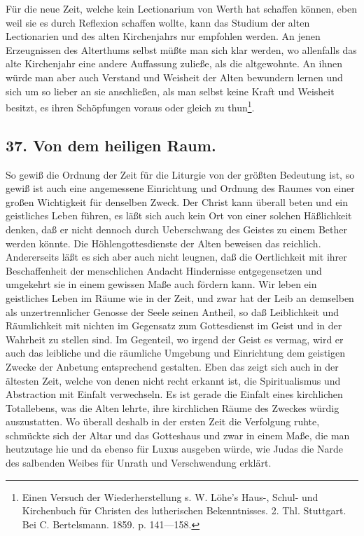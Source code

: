 Für die neue Zeit, welche kein Lectionarium von Werth hat schaffen können, eben weil sie es durch Reflexion schaffen
wollte, kann das Studium der alten Lectionarien und des alten Kirchenjahrs nur empfohlen werden. An jenen Erzeugnissen des Alterthums selbst müßte man sich klar werden, wo allenfalls das alte Kirchenjahr eine andere Auffassung zuließe, als die altgewohnte. An ihnen würde man aber auch Verstand und Weisheit der Alten bewundern lernen und sich um so lieber an sie anschließen, als man selbst keine Kraft und Weisheit besitzt, es ihren Schöpfungen voraus oder gleich zu thun\footnote{Einen Versuch der Wiederherstellung s. W. Löhe’s Haus-, Schul- und Kirchenbuch für Christen des lutherischen Bekenntnisses. 2. Thl. Stuttgart. Bei C. Bertelsmann. 1859. p. 141—158.}.

\subsection*{37. Von dem heiligen Raum.}

So gewiß die Ordnung der Zeit für die Liturgie von der größten Bedeutung ist, so gewiß ist auch eine angemessene Einrichtung und Ordnung des Raumes von einer großen Wichtigkeit für denselben Zweck. Der Christ kann überall beten und ein geistliches Leben führen, es läßt sich auch kein Ort von einer solchen Häßlichkeit denken, daß er nicht dennoch durch Ueberschwang des Geistes zu einem Bether werden könnte. Die Höhlengottesdienste der Alten beweisen das reichlich. Andererseits läßt es sich aber auch nicht leugnen, daß die Oertlichkeit mit ihrer Beschaffenheit der menschlichen Andacht Hindernisse entgegensetzen und umgekehrt sie in einem gewissen Maße auch fördern kann. Wir leben ein geistliches Leben im
Räume wie in der Zeit, und zwar hat der Leib an demselben als unzertrennlicher Genosse der Seele seinen Antheil, so daß Leiblichkeit und Räumlichkeit mit nichten im Gegensatz zum Gottesdienst im Geist und in der Wahrheit zu stellen sind. Im Gegenteil, wo irgend der Geist es vermag, wird er auch das leibliche und die räumliche Umgebung und Einrichtung dem geistigen Zwecke der Anbetung entsprechend gestalten. Eben das zeigt sich auch in der ältesten Zeit, welche von denen nicht recht erkannt ist, die Spiritualismus und Abstraction mit Einfalt verwechseln. Es ist gerade die Einfalt eines kirchlichen Totallebens, was die Alten lehrte, ihre kirchlichen Räume des Zweckes würdig auszustatten. Wo überall deshalb in der ersten Zeit die Verfolgung ruhte, schmückte sich der Altar und das Gotteshaus und zwar in einem Maße, die man heutzutage hie und da ebenso für Luxus ausgeben würde, wie Judas die Narde des salbenden Weibes für Unrath und Verschwendung erklärt.

